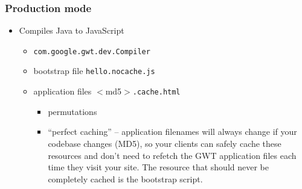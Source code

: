 \documentclass[10pt,table, xcolor=pdflatex]{beamer}
\begin{document}
\begin{frame}[fragile]\frametitle{Production mode}
	\begin{itemize}
		\item Compiles Java to JavaScript
          \begin{itemize}
        	\item \texttt{com.google.gwt.dev.Compiler}
            \item bootstrap file \texttt{hello.nocache.js}
            \item application files $<$md5$>$\texttt{.cache.html}
              \begin{itemize}
            	\item permutations
            	\item ``perfect caching'' -- application filenames will always change if your codebase changes (MD5), so your clients can safely cache these resources and don’t need to refetch the GWT application files each time they visit your site. The resource that should never be completely cached is the bootstrap script.
              \end{itemize}
          \end{itemize}
	\end{itemize}
\end{frame}
\end{document}

